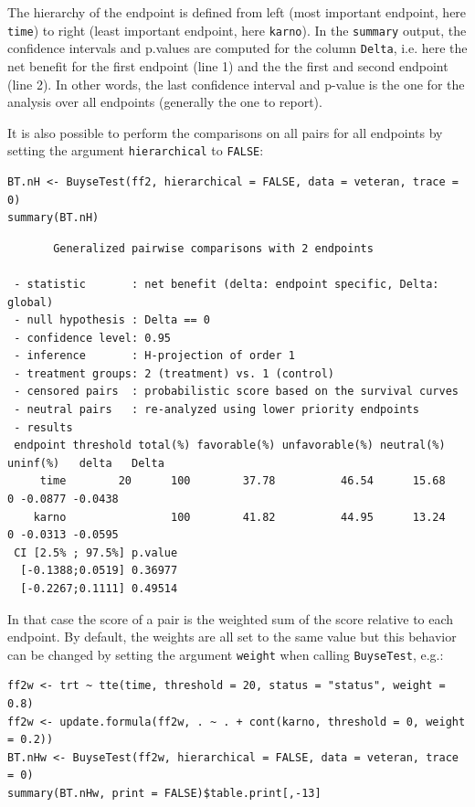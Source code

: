 \documentclass[12pt]{article}
\begin{document}
The hierarchy of the endpoint is defined from left (most important
endpoint, here \texttt{time}) to right (least important endpoint, here
\texttt{karno}). In the \texttt{summary} output, the confidence intervals and
p.values are computed for the column \texttt{Delta}, i.e. here the net
benefit for the first endpoint (line 1) and the the first and second
endpoint (line 2). In other words, the last confidence interval and
p-value is the one for the analysis over all endpoints (generally the
one to report).

\bigskip

It is also possible to perform the comparisons on all pairs for all
endpoints by setting the argument \texttt{hierarchical} to \texttt{FALSE}:
\lstset{language=r,label= ,caption= ,captionpos=b,numbers=none}
\begin{lstlisting}
BT.nH <- BuyseTest(ff2, hierarchical = FALSE, data = veteran, trace = 0)
summary(BT.nH)
\end{lstlisting}

\begin{verbatim}
       Generalized pairwise comparisons with 2 endpoints

 - statistic       : net benefit (delta: endpoint specific, Delta: global) 
 - null hypothesis : Delta == 0 
 - confidence level: 0.95 
 - inference       : H-projection of order 1
 - treatment groups: 2 (treatment) vs. 1 (control) 
 - censored pairs  : probabilistic score based on the survival curves
 - neutral pairs   : re-analyzed using lower priority endpoints
 - results
 endpoint threshold total(%) favorable(%) unfavorable(%) neutral(%) uninf(%)   delta   Delta
     time        20      100        37.78          46.54      15.68        0 -0.0877 -0.0438
    karno                100        41.82          44.95      13.24        0 -0.0313 -0.0595
 CI [2.5% ; 97.5%] p.value 
  [-0.1388;0.0519] 0.36977 
  [-0.2267;0.1111] 0.49514
\end{verbatim}

In that case the score of a pair is the weighted sum of the score
relative to each endpoint. By default, the weights are all set to the
same value but this behavior can be changed by setting the argument
\texttt{weight} when calling \texttt{BuyseTest}, e.g.:
\lstset{language=r,label= ,caption= ,captionpos=b,numbers=none}
\begin{lstlisting}
ff2w <- trt ~ tte(time, threshold = 20, status = "status", weight = 0.8)
ff2w <- update.formula(ff2w, . ~ . + cont(karno, threshold = 0, weight = 0.2))
BT.nHw <- BuyseTest(ff2w, hierarchical = FALSE, data = veteran, trace = 0)
summary(BT.nHw, print = FALSE)$table.print[,-13]
\end{lstlisting}
\end{document}
